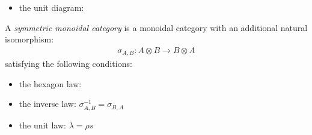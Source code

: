 \documentclass[DIN, pagenumber=false, fontsize=11pt, parskip=half, colorinlistoftodos, svgnames]{scrartcl}
\newcommand{\notimportantnote}[2][]{\todo[color=LightPink, #1]{#2}}
\begin{document}
\begin{definition}
\begin{itemize}
			\item the unit diagram:
			\begin{center}
			\end{center}
		\end{itemize}
		
	\end{definition}
	
	
	
	\begin{definition}
		A \emph{symmetric monoidal category} is a monoidal category with an additional natural isomorphism:
		\begin{align*}
			\sigma_{A,B}: A \otimes B \rightarrow B \otimes A
		\end{align*}
		satisfying the following conditions:
		\begin{itemize}
			\item 
				the hexagon law:
				\begin{center}
				\end{center}
			\item 
				the inverse law: $\sigma_{A, B}^{-1} = \sigma_{B, A} $
			\item 
				the unit law: $\lambda = \rho s$
				\begin{center}
				\end{center}
		\end{itemize}
	\end{definition}
	
\end{document}
